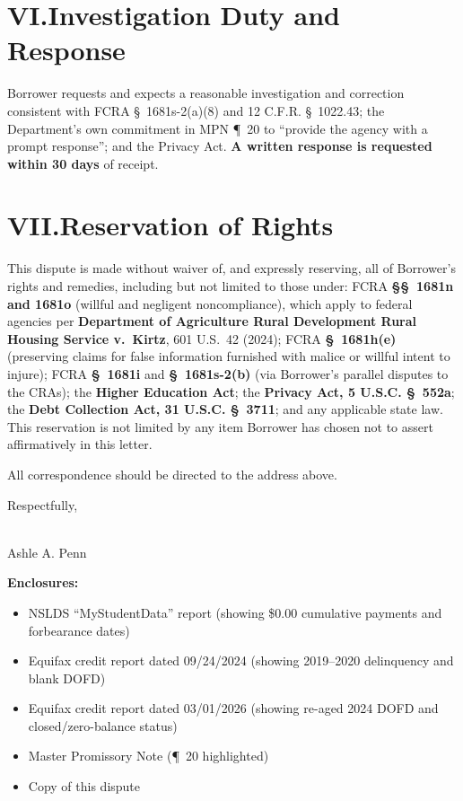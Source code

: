 \documentclass[11pt]{article}
\begin{document}
\section*{VI.\quad Investigation Duty and Response}

Borrower requests and expects a reasonable investigation and correction consistent with FCRA \S~1681s-2(a)(8) and 12 C.F.R. \S~1022.43; the Department's own commitment in MPN \P~20 to ``provide the agency with a prompt response''; and the Privacy Act. \textbf{A written response is requested within 30 days} of receipt.

\section*{VII.\quad Reservation of Rights}

This dispute is made without waiver of, and expressly reserving, all of Borrower's rights and remedies, including but not limited to those under: FCRA \textbf{\S\S~1681n and 1681o} (willful and negligent noncompliance), which apply to federal agencies per \textbf{Department of Agriculture Rural Development Rural Housing Service v.\ Kirtz}, 601 U.S.\ 42 (2024); FCRA \textbf{\S~1681h(e)} (preserving claims for false information furnished with malice or willful intent to injure); FCRA \textbf{\S~1681i} and \textbf{\S~1681s-2(b)} (via Borrower's parallel disputes to the CRAs); the \textbf{Higher Education Act}; the \textbf{Privacy Act, 5 U.S.C. \S~552a}; the \textbf{Debt Collection Act, 31 U.S.C. \S~3711}; and any applicable state law. This reservation is not limited by any item Borrower has chosen not to assert affirmatively in this letter.

\vspace{0.5em}
\noindent All correspondence should be directed to the address above.

\vspace{1.5em}
\noindent Respectfully,

\vspace{1.5em}
\noindent\underline{\hspace{7cm}}\\
Ashle A. Penn

\vspace{1em}
\noindent \textbf{Enclosures:}
\begin{itemize}
  \item NSLDS ``MyStudentData'' report (showing \$0.00 cumulative payments and forbearance dates)
  \item Equifax credit report dated 09/24/2024 (showing 2019--2020 delinquency and blank DOFD)
  \item Equifax credit report dated 03/01/2026 (showing re-aged 2024 DOFD and closed/zero-balance status)
  \item Master Promissory Note (\P~20 highlighted)
  \item Copy of this dispute
\end{itemize}
\end{document}
